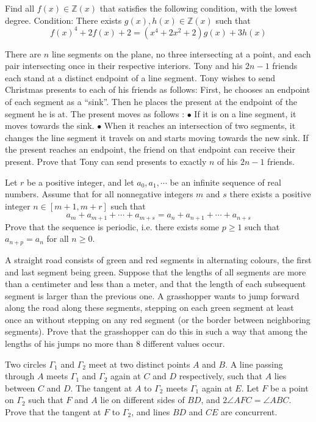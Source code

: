 \documentclass[11pt]{scrartcl}
\begin{document}
\begin{problem}[5790808043328490922]
Find all $f(x)\in \mathbb Z (x)$ that satisfies the following condition, with the lowest degree.
Condition: There exists $g(x),h(x)\in \mathbb Z (x)$ such that$$f(x)^4+2f(x)+2=(x^4+2x^2+2)g(x)+3h(x)$$
\end{problem}
\begin{problem}[671689594281308077]
There are $n$ line segments on the plane, no three intersecting at a point, and each pair intersecting once in their respective interiors. Tony and his $2n - 1$ friends each stand at a distinct endpoint of a line segment. Tony wishes to send Christmas presents to each of his friends as follows:
First, he chooses an endpoint of each segment as a “sink”. Then he places the present at
the endpoint of the segment he is at. The present moves as follows :
$\bullet$ If it is on a line segment, it moves towards the sink.
$\bullet$ When it reaches an intersection of two segments, it changes the line segment it travels on and starts moving towards the new sink.
If the present reaches an endpoint, the friend on that endpoint can receive their present.
Prove that Tony can send presents to exactly $n$ of his $2n - 1$ friends.
\end{problem}
\begin{problem}[141708904596471]
Let $r$ be a positive integer, and let $a_0 , a_1 , \cdots $ be an infinite sequence of real numbers. Assume that for all nonnegative integers $m$ and $s$ there exists a positive integer $n \in [m+1, m+r]$ such that
\[ a_m + a_{m+1} +\cdots +a_{m+s} = a_n + a_{n+1} +\cdots +a_{n+s} \]
Prove that the sequence is periodic, i.e. there exists some $p \ge 1 $ such that $a_{n+p} =a_n $ for all $n \ge 0$.
\end{problem}
\begin{problem}[221644122066923]
A straight road consists of green and red segments in alternating colours, the first and last segment being green. Suppose that the lengths of all segments are more than a centimeter and less than a meter, and that the length of each subsequent segment is larger than the previous one. A grasshopper wants to jump forward along the road along these segments, stepping on each green segment at least once an without stepping on any red segment (or the border between neighboring segments). Prove that the grasshopper can do this in such a way that among the lengths of his jumps no more than $8$ different values occur.
\end{problem}
\begin{problem}[7618489197525]
	Two circles $\Gamma_1$ and $\Gamma_2$ meet at two distinct points $A$ and $B$. A line passing through $A$ meets $\Gamma_1$ and $\Gamma_2$ again at $C$ and $D$ respectively, such that $A$ lies between $C$ and $D$. The tangent at $A$ to $\Gamma_2$ meets $\Gamma_1$ again at $E$. Let $F$ be a point on $\Gamma_2$ such that $F$ and $A$ lie on different sides of $BD$, and $2\angle AFC=\angle ABC$. Prove that the tangent at $F$ to $\Gamma_2$, and lines $BD$ and $CE$ are concurrent.
\end{problem}
\end{document}
